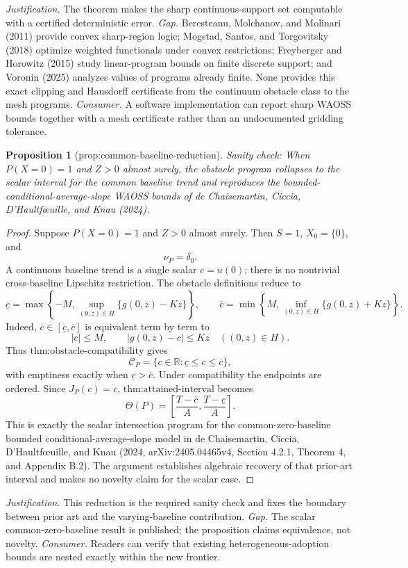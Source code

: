 \documentclass{article}
\newtheorem{proposition}{Proposition}
\begin{document}
\par\smallskip\noindent \textit{Justification.} The theorem makes the sharp continuous-support set computable with a certified deterministic error. \textit{Gap.} Beresteanu, Molchanov, and Molinari (2011) provide convex sharp-region logic; Mogstad, Santos, and Torgovitsky (2018) optimize weighted functionals under convex restrictions; Freyberger and Horowitz (2015) study linear-program bounds on finite discrete support; and Voronin (2025) analyzes values of programs already finite. None provides this exact clipping and Hausdorff certificate from the continuum obstacle class to the mesh programs. \textit{Consumer.} A software implementation can report sharp WAOSS bounds together with a mesh certificate rather than an undocumented gridding tolerance.

\begin{proposition}[prop:common-baseline-reduction]\label{prop:common-baseline-reduction}
Sanity check: When \(P(X=0)=1\) and \(Z>0\) almost surely, the obstacle program collapses to the scalar interval for the common baseline trend and reproduces the bounded-conditional-average-slope WAOSS bounds of de Chaisemartin, Ciccia, D'Haultf\oe{}uille, and Knau (2024).
\end{proposition}
\begin{proof}
Suppose \(P(X=0)=1\) and \(Z>0\) almost surely.  Then \(S=1\), \(X_0=\{0\}\), and
\[
 \nu_P=\delta_0.
\]
A continuous baseline trend is a single scalar \(c=u(0)\); there is no nontrivial cross-baseline Lipschitz restriction.  The obstacle definitions reduce to
\[
 \underline c
 =\max\left\{-M,\sup_{(0,z)\in H}\{g(0,z)-Kz\}\right\},
 \qquad
 \overline c
 =\min\left\{M,\inf_{(0,z)\in H}\{g(0,z)+Kz\}\right\}.
\]
Indeed, \(c\in[\underline c,\overline c]\) is equivalent term by term to
\[
 |c|\leq M,
 \qquad
 |g(0,z)-c|\leq Kz
 \quad((0,z)\in H).
\]
Thus \(\text{thm:obstacle-compatibility}\) gives
\[
 \mathcal C_P=\{c\in\mathbb R:\underline c\leq c\leq\overline c\},
\]
with emptiness exactly when \(\underline c>\overline c\).  Under compatibility the endpoints are ordered.  Since \(J_P(c)=c\), \(\text{thm:attained-interval}\) becomes
\[
 \Theta(P)=
 \left[\frac{T-\overline c}{A},
       \frac{T-\underline c}{A}\right].
\]
This is exactly the scalar intersection program for the common-zero-baseline bounded conditional-average-slope model in de Chaisemartin, Ciccia, D'Haultf\oe{}uille, and Knau (2024, arXiv:2405.04465v4, Section 4.2.1, Theorem 4, and Appendix B.2).  The argument establishes algebraic recovery of that prior-art interval and makes no novelty claim for the scalar case.
\end{proof}
\par\smallskip\noindent \textit{Justification.} This reduction is the required sanity check and fixes the boundary between prior art and the varying-baseline contribution. \textit{Gap.} The scalar common-zero-baseline result is published; the proposition claims equivalence, not novelty. \textit{Consumer.} Readers can verify that existing heterogeneous-adoption bounds are nested exactly within the new frontier.
\end{document}
